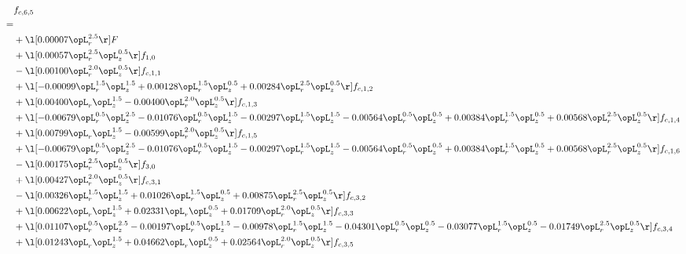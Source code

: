 \begin{alignat}{2} 
\label{eq:f_65_1} 
& f_{c,6,5} \nonumber \\ 
 = \\ 
& + \l[  0.00007 \opL_r^{2.5}  \r] F \nonumber \\ 
& + \l[  0.00057 \opL_r^{2.5} \opL_z^{0.5}  \r] f_{1,0} \nonumber \\ 
& - \l[  0.00100 \opL_r^{2.0} \opL_z^{0.5}  \r] f_{c,1,1} \nonumber \\ 
& + \l[  -0.00099 \opL_r^{1.5} \opL_z^{1.5} +  0.00128 \opL_r^{1.5} \opL_z^{0.5} +  0.00284 \opL_r^{2.5} \opL_z^{0.5}  \r] f_{c,1,2} \nonumber \\ 
& + \l[  0.00400 \opL_r \opL_z^{1.5}   -0.00400 \opL_r^{2.0} \opL_z^{0.5}  \r] f_{c,1,3} \nonumber \\ 
& + \l[  -0.00679 \opL_r^{0.5} \opL_z^{2.5}   -0.01076 \opL_r^{0.5} \opL_z^{1.5}   -0.00297 \opL_r^{1.5} \opL_z^{1.5}   -0.00564 \opL_r^{0.5} \opL_z^{0.5} +  0.00384 \opL_r^{1.5} \opL_z^{0.5} +  0.00568 \opL_r^{2.5} \opL_z^{0.5}  \r] f_{c,1,4} \nonumber \\ 
& + \l[  0.00799 \opL_r \opL_z^{1.5}   -0.00599 \opL_r^{2.0} \opL_z^{0.5}  \r] f_{c,1,5} \nonumber \\ 
& + \l[  -0.00679 \opL_r^{0.5} \opL_z^{2.5}   -0.01076 \opL_r^{0.5} \opL_z^{1.5}   -0.00297 \opL_r^{1.5} \opL_z^{1.5}   -0.00564 \opL_r^{0.5} \opL_z^{0.5} +  0.00384 \opL_r^{1.5} \opL_z^{0.5} +  0.00568 \opL_r^{2.5} \opL_z^{0.5}  \r] f_{c,1,6} \nonumber \\ 
& - \l[  0.00175 \opL_r^{2.5} \opL_z^{0.5}  \r] f_{3,0} \nonumber \\ 
& + \l[  0.00427 \opL_r^{2.0} \opL_z^{0.5}  \r] f_{c,3,1} \nonumber \\ 
& - \l[  0.00326 \opL_r^{1.5} \opL_z^{1.5} +  0.01026 \opL_r^{1.5} \opL_z^{0.5} +  0.00875 \opL_r^{2.5} \opL_z^{0.5}  \r] f_{c,3,2} \nonumber \\ 
& + \l[  0.00622 \opL_r \opL_z^{1.5} +  0.02331 \opL_r \opL_z^{0.5} +  0.01709 \opL_r^{2.0} \opL_z^{0.5}  \r] f_{c,3,3} \nonumber \\ 
& + \l[  0.01107 \opL_r^{0.5} \opL_z^{2.5}   -0.00197 \opL_r^{0.5} \opL_z^{1.5}   -0.00978 \opL_r^{1.5} \opL_z^{1.5}   -0.04301 \opL_r^{0.5} \opL_z^{0.5}   -0.03077 \opL_r^{1.5} \opL_z^{0.5}   -0.01749 \opL_r^{2.5} \opL_z^{0.5}  \r] f_{c,3,4} \nonumber \\ 
& + \l[  0.01243 \opL_r \opL_z^{1.5} +  0.04662 \opL_r \opL_z^{0.5} +  0.02564 \opL_r^{2.0} \opL_z^{0.5}  \r] f_{c,3,5} \nonumber \\ 

\end{alignat}
